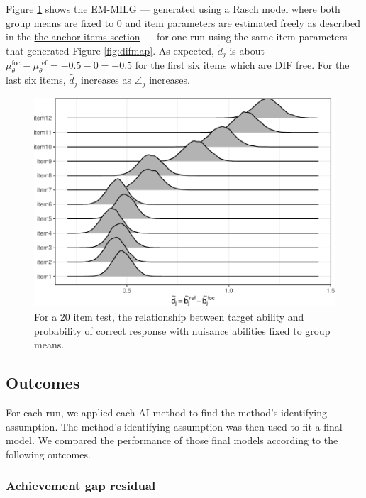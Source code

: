 \documentclass[
  11pt,
]{article}
\begin{document}
Figure \ref{fig:simemmlg} shows the EM-MILG --- generated using a Rasch model where both group means are fixed to 0 and item parameters are estimated freely as described in the \protect\hyperlink{anchoritems}{the anchor items section} --- for one run using the same item parameters that generated Figure \ref{fig:difmap}. As expected, \(\tilde{d_j}\) is about \(\mu_\theta^\text{foc} - \mu_\theta^\text{ref} = -0.5 - 0 = -0.5\) for the first six items which are DIF free. For the last six items, \(\tilde{d_j}\) increases as \(\angle_j\) increases.

\begin{figure}[H]

{\centering \includegraphics[width=0.7\linewidth]{paper_files/figure-latex/simemmlg-1} 

}

\caption{For a 20 item test, the relationship between target ability and probability of correct response with nuisance abilities fixed to group means.}\label{fig:simemmlg}
\end{figure}

\hypertarget{outcomes}{%
\subsection{Outcomes}\label{outcomes}}

For each run, we applied each AI method to find the method's identifying assumption. The method's identifying assumption was then used to fit a final model. We compared the performance of those final models according to the following outcomes.

\hypertarget{achievement-gap-residual}{%
\subsubsection{Achievement gap residual}\label{achievement-gap-residual}}
\end{document}
